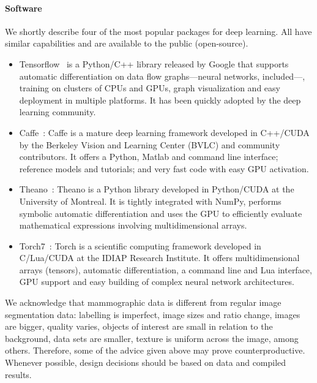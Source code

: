 \paragraph{Software} We shortly describe four of the most popular packages for deep learning. All have similar capabilities and are available to the public (open-source).

\begin{itemize}
	\item Tensorflow~\cite{Abadi2015} is a Python/C++ library released by Google that supports automatic differentiation on data flow graphs---neural networks, included---, training on clusters of CPUs and GPUs, graph visualization and easy deployment in multiple platforms. It has been quickly adopted by the deep learning community.
	\item Caffe~\cite{Jia2014}: Caffe is a mature deep learning framework developed in C++/CUDA by the Berkeley Vision and Learning Center (BVLC) and community contributors. It offers a Python, Matlab and command line interface; reference models and tutorials; and very fast code with easy GPU activation.
	\item Theano~\cite{Bergstra2010, Bastien2012}: Theano is a Python library developed in Python/CUDA at the University of Montreal. It is tightly integrated with NumPy, performs symbolic automatic differentiation and uses the GPU to efficiently evaluate mathematical expressions involving multidimensional arrays.
	\item Torch7~\cite{Collobert2011}: Torch is a scientific computing framework developed in C/Lua/CUDA at the IDIAP Research Institute. It offers multidimensional arrays (tensors), automatic differentiation, a command line and Lua interface, GPU support and easy building of complex neural network architectures.
\end{itemize}

\bigskip

We acknowledge that mammographic data is different from regular image segmentation data: labelling is imperfect, image sizes and ratio change, images are bigger, quality varies, objects of interest are small in relation to the background, data sets are smaller, texture is uniform across the image, among others. Therefore, some of the advice given above may prove counterproductive. Whenever possible, design decisions should be based on data and compiled results.
